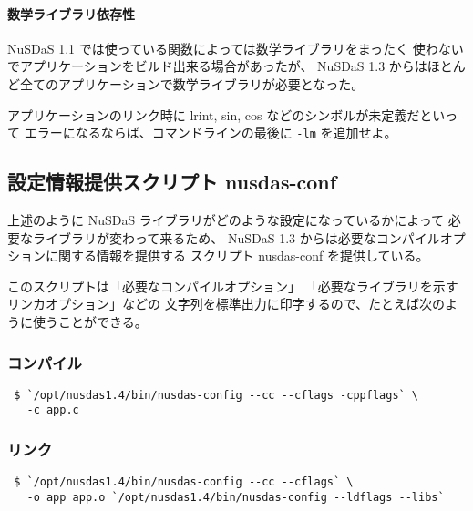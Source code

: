 \paragraph{数学ライブラリ依存性}

NuSDaS 1.1 では使っている関数によっては数学ライブラリをまったく
使わないでアプリケーションをビルド出来る場合があったが、
NuSDaS 1.3 からはほとんど全てのアプリケーションで数学ライブラリが必要となった。

アプリケーションのリンク時に lrint, sin, cos などのシンボルが未定義だといって
エラーになるならば、コマンドラインの最後に \verb|-lm| を追加せよ。

\subsection{設定情報提供スクリプト nusdas-conf}

上述のように NuSDaS ライブラリがどのような設定になっているかによって
必要なライブラリが変わって来るため、
NuSDaS 1.3 からは必要なコンパイルオプションに関する情報を提供する
スクリプト nusdas-conf を提供している。

このスクリプトは「必要なコンパイルオプション」
「必要なライブラリを示すリンカオプション」などの
文字列を標準出力に印字するので、たとえば次のように使うことができる。

\subsubsection*{コンパイル}
\begin{screen}
\begin{verbatim}
 $ `/opt/nusdas1.4/bin/nusdas-config --cc --cflags -cppflags` \
   -c app.c
\end{verbatim}
\end{screen}

\subsubsection*{リンク}
\begin{screen}
\begin{verbatim}
 $ `/opt/nusdas1.4/bin/nusdas-config --cc --cflags` \
   -o app app.o `/opt/nusdas1.4/bin/nusdas-config --ldflags --libs`
\end{verbatim}
\end{screen}

